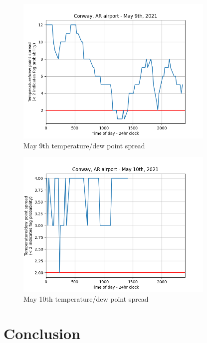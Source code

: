 \documentclass{article}
\begin{document}
\begin{figure}[hbp!]
\begin{center}
\includegraphics[width=0.85\textwidth]{May9th.png}
\end{center}
\caption{May 9th temperature/dew point spread}
\label{May 9th}
\end{figure}

\begin{figure}[htp!]
\begin{center}
\includegraphics[width=0.85\textwidth]{May10th.png}
\end{center}
\caption{May 10th temperature/dew point spread}
\label{May 10th}
\end{figure}

\newpage
\newpage
\newpage
\newpage

\section{Conclusion}
\end{document}

